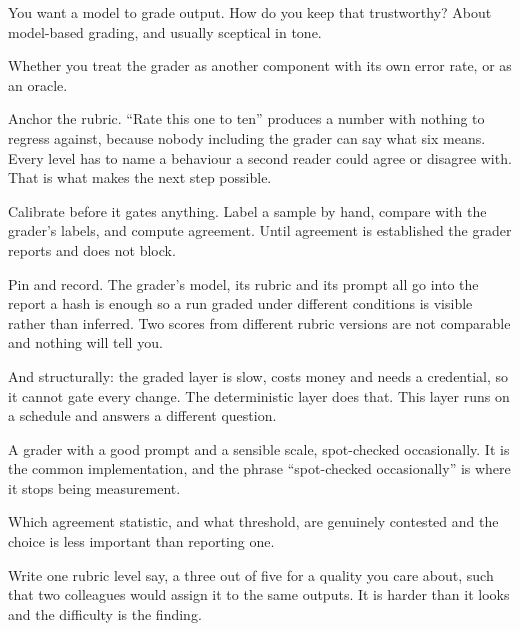\begin{bankq}{You want a model to grade output. How do you keep that trustworthy?}
\qasked
About model-based grading, and usually sceptical in tone.

\qtested
Whether you treat the grader as another component with its own error rate, or
as an oracle.

\qstaff
Anchor the rubric. ``Rate this one to ten'' produces a number with nothing to
regress against, because nobody \dash{} including the grader \dash{} can say
what six means. Every level has to name a behaviour a second reader could agree
or disagree with. That is what makes the next step possible.

Calibrate before it gates anything. Label a sample by hand, compare with the
grader's labels, and compute agreement. Until agreement is established the
grader reports and does not block. 

Pin and record. The grader's model, its rubric and its prompt all go into the
report \dash{} a hash is enough \dash{} so a run graded under different
conditions is visible rather than inferred. Two scores from different rubric
versions are not comparable and nothing will tell you.

And structurally: the graded layer is slow, costs money and needs a credential,
so it cannot gate every change. The deterministic layer does that. This layer
runs on a schedule and answers a different question.

\qsenior
A grader with a good prompt and a sensible scale, spot-checked occasionally. It
is the common implementation, and the phrase ``spot-checked occasionally'' is
where it stops being measurement.

\qcontested
Which agreement statistic, and what threshold, are genuinely contested and the
choice is less important than reporting one. 

\qdrill
Write one rubric level \dash{} say, a three out of five \dash{} for a quality
you care about, such that two colleagues would assign it to the same outputs.
It is harder than it looks and the difficulty is the finding.
\end{bankq}

